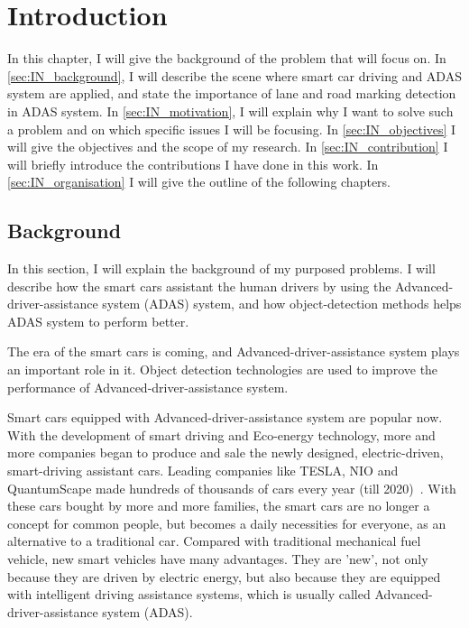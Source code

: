 
\chapter{Introduction}
\begin{spacing}{1.5}
\setlength{\parskip}{0.3in}

In this chapter, I will give the background of the problem that will focus on. In \autoref{sec:IN_background}, I will describe the scene where smart car driving and ADAS system are applied, and state the importance of lane and road marking detection in ADAS system. In \autoref{sec:IN_motivation}, I will explain why I want to solve such a problem and on which specific issues I will be focusing. In \autoref{sec:IN_objectives} I will give the objectives and the scope of my research. In \autoref{sec:IN_contribution} I will briefly introduce the contributions I have done in this work. In \autoref{sec:IN_organisation} I will give the outline of the following chapters.

\section{Background}
\label{sec:IN_background}

In this section, I will explain the background of my purposed problems. I will describe how the smart cars assistant the human drivers by using the Advanced-driver-assistance system (ADAS) system, and how object-detection methods helps ADAS system to perform better.

The era of the smart cars is coming, and Advanced-driver-assistance system plays an important role in it. Object detection technologies are used to improve the performance of Advanced-driver-assistance system.

Smart cars equipped with Advanced-driver-assistance system are popular now. With the development of smart driving and Eco-energy technology, more and more companies began to produce and sale the newly designed, electric-driven, smart-driving assistant cars. Leading companies like TESLA, NIO and QuantumScape made hundreds of thousands of cars every year (till 2020)~\cite{petranek2015we}. With these cars bought by more and more families, the smart cars are no longer a concept for common people, but becomes a daily necessities for everyone, as an alternative to a traditional car. Compared with traditional mechanical fuel vehicle, new smart vehicles have many advantages. They are 'new', not only because they are driven by electric energy, but also because they are equipped with intelligent driving assistance systems, which is usually called Advanced-driver-assistance system (ADAS).


\end{spacing}
